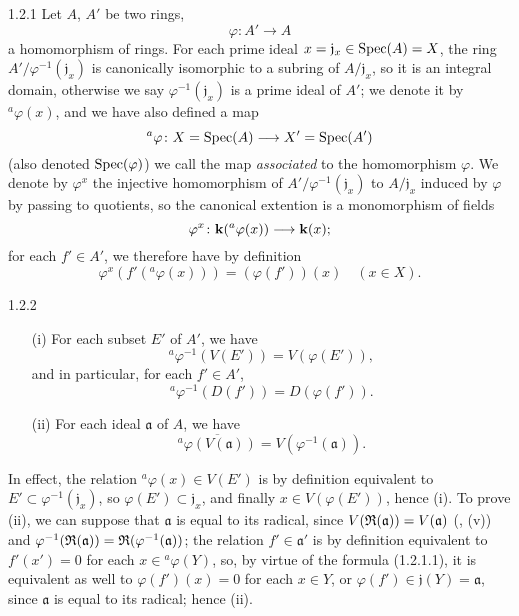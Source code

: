 
\begin{env}{1.2.1}
\label{env-1.1.2.1}
Let $A$, $A'$ be two rings,
\[
  \varphi\colon A'\longrightarrow A
\]
a homomorphism of rings. For each prime ideal $x=\mathfrak{j}_x\in\operatorname{Spec}(A)=X$, the
ring $A'/\varphi^{-1}(\mathfrak{j}_x)$ is canonically isomorphic to a subring of
$A/\mathfrak{j}_x$, so it is an integral domain, otherwise we say
$\varphi^{-1}(\mathfrak{j}_x)$ is a prime ideal of $A'$; we denote it by
$^a\varphi(x)$, and we have also defined a map
\[
  ^a\varphi\colon X=\operatorname{Spec}(A)\longrightarrow X'=\operatorname{Spec}(A')
\]
(also denoted $\operatorname{Spec}(\varphi)$) we call the map \emph{associated} to the
homomorphism $\varphi$. We denote by $\varphi^x$ the injective homomorphism of
$A'/\varphi^{-1}(\mathfrak{j}_x)$ to $A/\mathfrak{j}_x$ induced by $\varphi$ by
passing to quotients, so the canonical extention is a monomorphism of fields
\[
  \varphi^x\colon\mathbf{k}(^a\varphi(x))\longrightarrow\mathbf{k}(x);
\]
for each $f'\in A'$, we therefore have by definition
\[
  \varphi^x(f'(^a\varphi(x)))=(\varphi(f'))(x)\quad(x\in X).\tag{1.2.1.1}
\]
\end{env}

\begin{env}[Proposition]{1.2.2}
\label{prop-1.1.2.2}
\medskip\noindent
\begin{itemize}
  \item[(i)] For each subset $E'$ of $A'$, we have
             \[
               ^a\varphi^{-1}(V(E'))=V(\varphi(E')),\tag{1.2.2.1}
             \]
             and in particular, for each $f'\in A'$,
             \[
               ^a\varphi^{-1}(D(f'))=D(\varphi(f')).\tag{1.2.2.2}
             \]
  \item[(ii)] For each ideal $\mathfrak{a}$ of $A$, we have
              \[
                \overline{^a\varphi(V(\mathfrak{a}))}=V(\varphi^{-1}(\mathfrak{a})).
                \tag{1.2.2.3}
              \]
\end{itemize}
\end{env}

In effect, the relation $^a\varphi(x)\in V(E')$ is by definition equivalent to
$E'\subset\varphi^{-1}(\mathfrak{j}_x)$, so $\varphi(E')\subset\mathfrak{j}_x$, and
finally $x\in V(\varphi(E'))$, hence (i). To prove (ii), we can suppose that
$\mathfrak{a}$ is equal to its radical, since $V(\mathfrak{R}(\mathfrak{a}))=V(\mathfrak{a})$
(, (v)) and
$\varphi^{-1}(\mathfrak{R}(\mathfrak{a}))=\mathfrak{R}(\varphi^{-1}(\mathfrak{a}))$; the relation
$f'\in\mathfrak{a}'$ is by definition equivalent to $f'(x')=0$ for each
$x\in{^a\varphi(Y)}$, so, by virtue of the formula (1.2.1.1), it is equivalent as well
to $\varphi(f')(x)=0$ for each $x\in Y$, or $\varphi(f')\in\mathfrak{j}(Y)=\mathfrak{a}$,
since $\mathfrak{a}$ is equal to its radical; hence (ii).



